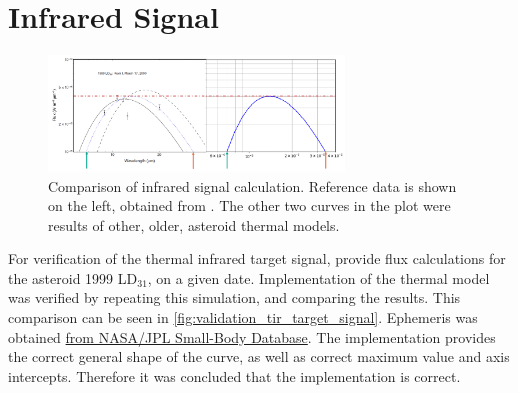 \section{Infrared Signal}
\label{sec:vvinfrared}

\begin{figure}[htbp]
 \centering
 \includegraphics[width=0.7\textwidth]{img/validation_tir_target_signal.png}
 \caption{Comparison of infrared signal calculation. Reference data is shown on the left, obtained from \cite{AsteroidNEATM}. The other two curves in the plot were results of other, older, asteroid thermal models.}
 \label{fig:validation_tir_target_signal}
\end{figure}

For verification of the thermal infrared target signal, \cite{AsteroidNEATM} provide flux calculations for the asteroid 1999 LD$_{31}$, on a given date. Implementation of the thermal model was verified by repeating this simulation, and comparing the results. This comparison can be seen in \autoref{fig:validation_tir_target_signal}. Ephemeris was obtained \href{https://ssd.jpl.nasa.gov/tools/sbdb\_lookup.html#/?sstr=1999\%20LD31}{from NASA/JPL Small-Body Database}. The implementation provides the correct general shape of the curve, as well as correct maximum value and axis intercepts. Therefore it was concluded that the implementation is correct.

